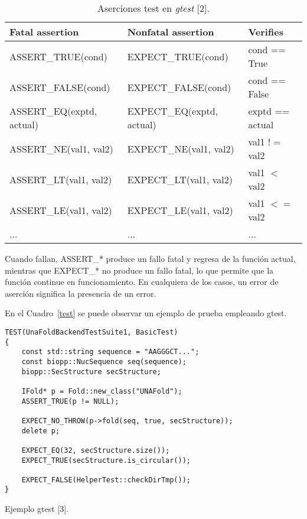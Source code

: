 \begin{table}[!hbt]
	\begin{center}
		\begin{tabular}{|l|l|l|}
			\hline
			Fatal assertion & Nonfatal assertion & Verifies \\
			\hline
			ASSERT\_TRUE(cond) & EXPECT\_TRUE(cond) & cond == True\\ \hline
			ASSERT\_FALSE(cond) & EXPECT\_FALSE(cond) & cond == False\\ \hline
			ASSERT\_EQ(exptd, actual) & EXPECT\_EQ(exptd, actual) & exptd == actual\\ \hline
			ASSERT\_NE(val1, val2) &	EXPECT\_NE(val1, val2) &	val1 $!=$ val2\\ \hline
			ASSERT\_LT(val1, val2) &	EXPECT\_LT(val1, val2) & val1 $<$ val2\\ \hline
			ASSERT\_LE(val1, val2) &	EXPECT\_LE(val1, val2) &	val1 $<=$ val2\\ \hline
			... & ... & ...\\ \hline
		\end{tabular}
		\caption{Aserciones test en \emph{gtest} [2].}
		\label{aserciones}
	\end{center}
\end{table}

Cuando fallan, ASSERT\_* produce un fallo fatal y regresa de la función actual, mientras que EXPECT\_* no produce un fallo fatal, lo que permite que la función continue en funcionamiento. En cualquiera de los casos, un error de aserción significa la presencia de un error.

\par En el Cuadro~\ref{test} se puede observar un ejemplo de prueba empleando gtest.

\begin{table}[!h]
    \lstset{language=C++}
    \begin{lstlisting}[frame=single]
TEST(UnaFoldBackendTestSuite1, BasicTest)
{
    const std::string sequence = "AAGGGCT...";
    const biopp::NucSequence seq(sequence);
    biopp::SecStructure secStructure;

    IFold* p = Fold::new_class("UNAFold");
    ASSERT_TRUE(p != NULL);

    EXPECT_NO_THROW(p->fold(seq, true, secStructure));
    delete p;

    EXPECT_EQ(32, secStructure.size());
    EXPECT_TRUE(secStructure.is_circular());

    EXPECT_FALSE(HelperTest::checkDirTmp());
}

    \end{lstlisting}
    \centering \caption{Ejemplo gtest [3].}
    \label{test}
\end{table}


